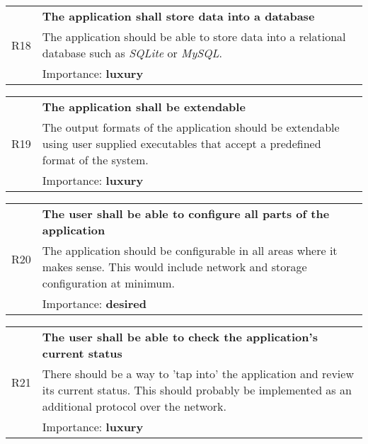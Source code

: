             \vspace{0.5cm}
            \noindent
            \begin{tabular}{ p{0.7cm}|p{14.5cm} }
                \multirow{3}{*}{R18} & \textbf{The application shall store data into a database}\\
                \cline{2-2}
                & The application should be able to store data into a relational database such as \textit{SQLite} or \textit{MySQL}.\\
                \cline{2-2}
                & Importance: \textbf{luxury}
            \end{tabular}

            \vspace{0.5cm}
            \noindent
            \begin{tabular}{ p{0.7cm}|p{14.5cm} }
                \multirow{3}{*}{R19} & \textbf{The application shall be extendable}\\
                \cline{2-2}
                & The output formats of the application should be extendable using user supplied executables that accept a predefined format of the system.\\
                \cline{2-2}
                & Importance: \textbf{luxury}
            \end{tabular}

            \vspace{0.5cm}
            \noindent
            \begin{tabular}{ p{0.7cm}|p{14.5cm} }
                \multirow{3}{*}{R20} & \textbf{The user shall be able to configure all parts of the application}\\
                \cline{2-2}
                & The application should be configurable in all areas where it makes sense. This would include network and storage configuration at minimum.\\
                \cline{2-2}
                & Importance: \textbf{desired}
            \end{tabular}

            \vspace{0.5cm}
            \noindent
            \begin{tabular}{ p{0.7cm}|p{14.5cm} }
                \multirow{3}{*}{R21} & \textbf{The user shall be able to check the application's current status}\\
                \cline{2-2}
                & There should be a way to 'tap into' the application and review its current status. This should probably be implemented as an additional protocol over the network.\\
                \cline{2-2}
                & Importance: \textbf{luxury}
            \end{tabular}


